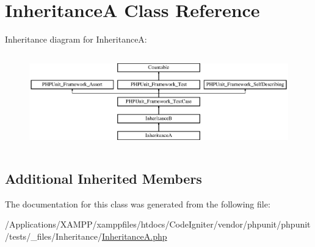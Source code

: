 \hypertarget{class_inheritance_a}{}\section{InheritanceA Class Reference}
\label{class_inheritance_a}
Inheritance diagram for InheritanceA\+:\begin{figure}[H]
\begin{center}
\leavevmode
\includegraphics[height=4.129793cm]{class_inheritance_a}
\end{center}
\end{figure}
\subsection*{Additional Inherited Members}


The documentation for this class was generated from the following file\+:\begin{DoxyCompactItemize}
\item 
/\+Applications/\+X\+A\+M\+P\+P/xamppfiles/htdocs/\+Code\+Igniter/vendor/phpunit/phpunit/tests/\+\_\+files/\+Inheritance/\mbox{\hyperlink{_inheritance_a_8php}{Inheritance\+A.\+php}}\end{DoxyCompactItemize}
